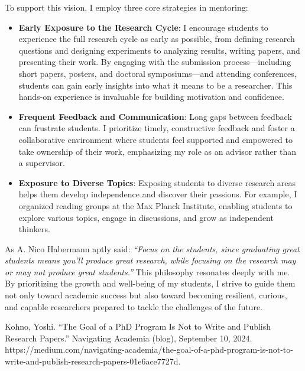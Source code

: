 \documentclass{article}
\begin{document}
To support this vision, I employ three core strategies in mentoring:
\begin{itemize}
    \item \textbf{Early Exposure to the Research Cycle}: I encourage students to experience the full research cycle as early as possible, from defining research questions and designing experiments to analyzing results, writing papers, and presenting their work. By engaging with the submission process—including short papers, posters, and doctoral symposiums—and attending conferences, students can gain early insights into what it means to be a researcher. This hands-on experience is invaluable for building motivation and confidence.
    \item \textbf{Frequent Feedback and Communication}: Long gaps between feedback can frustrate students. I prioritize timely, constructive feedback and foster a collaborative environment where students feel supported and empowered to take ownership of their work, emphasizing my role as an advisor rather than a supervisor.
    \item \textbf{Exposure to Diverse Topics}: Exposing students to diverse research areas helps them develop independence and discover their passions. For example, I organized reading groups at the Max Planck Institute, enabling students to explore various topics, engage in discussions, and grow as independent thinkers.
\end{itemize}

As A. Nico Habermann aptly said: \emph{``Focus on the students, since graduating great students means you'll produce great research, while focusing on the research may or may not produce great students.''} This philosophy resonates deeply with me. By prioritizing the growth and well-being of my students, I strive to guide them not only toward academic success but also toward becoming resilient, curious, and capable researchers prepared to tackle the challenges of the future.


\begin{thebibliography}{9}
Kohno, Yoshi. “The Goal of a PhD Program Is Not to Write and Publish Research Papers.” Navigating Academia (blog), September 10, 2024. https://medium.com/navigating-academia/the-goal-of-a-phd-program-is-not-to-write-and-publish-research-papers-01e6ace7727d.
\end{thebibliography}
\end{document}
